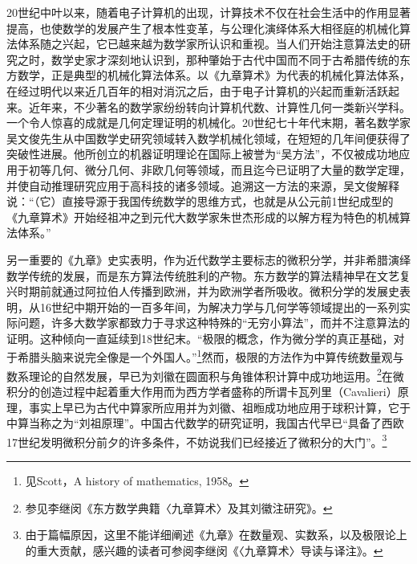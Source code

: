 \documentclass[12pt,UTF8]{ctexbook}
\begin{document}
20世纪中叶以来，随着电子计算机的出现，计算技术不仅在社会生活中的作用显著提高，也使数学的发展产生了根本性变革，与公理化演绎体系大相径庭的机械化算法体系随之兴起，它已越来越为数学家所认识和重视。当人们开始注意算法史的研究之时，数学史家才深刻地认识到，那种肇始于古代中国而不同于古希腊传统的东方数学，正是典型的机械化算法体系。以《九章算术》为代表的机械化算法体系，在经过明代以来近几百年的相对消沉之后，由于电子计算机的兴起而重新活跃起来。近年来，不少著名的数学家纷纷转向计算机代数、计算性几何一类新兴学科。一个令人惊喜的成就是几何定理证明的机械化。20世纪七十年代末期，著名数学家吴文俊先生从中国数学史研究领域转入数学机械化领域，在短短的几年间便获得了突破性进展。他所创立的机器证明理论在国际上被誉为“吴方法”，不仅被成功地应用于初等几何、微分几何、非欧几何等领域，而且迄今已证明了大量的数学定理，并使自动推理研究应用于高科技的诸多领域。追溯这一方法的来源，吴文俊解释说：“（它）直接导源于我国传统数学的思维方式，也就是从公元前1世纪成型的《九章算术》开始经祖冲之到元代大数学家朱世杰形成的以解方程为特色的机械算法体系。”

另一重要的《九章》史实表明，作为近代数学主要标志的微积分学，并非希腊演绎数学传统的发展，而是东方算法传统胜利的产物。东方数学的算法精神早在文艺复兴时期前就通过阿拉伯人传播到欧洲，并为欧洲学者所吸收。微积分学的发展史表明，从16世纪中期开始的一百多年间，为解决力学与几何学等领域提出的一系列实际问题，许多大数学家都致力于寻求这种特殊的“无穷小算法”，而并不注意算法的证明。这种倾向一直延续到18世纪末。“极限的概念，作为微分学的真正基础，对于希腊头脑来说完全像是一个外国人。”\footnote{见Scott，A history of mathematics, 1958。}然而，极限的方法作为中算传统数量观与数系理论的自然发展，早已为刘徽在圆面积与角锥体积计算中成功地运用。\footnote{参见李继闵《东方数学典籍〈九章算术〉及其刘徽注研究》。}在微积分的创造过程中起着重大作用而为西方学者盛称的所谓卡瓦列里（Cavalieri）原理，事实上早已为古代中算家所应用并为刘徽、祖暅成功地应用于球积计算，它于中算当称之为“刘祖原理”。中国古代数学的研究证明，我国古代早已“具备了西欧17世纪发明微积分前夕的许多条件，不妨说我们已经接近了微积分的大门”。\footnote{由于篇幅原因，这里不能详细阐述《九章》在数量观、实数系，以及极限论上的重大贡献，感兴趣的读者可参阅李继闵《〈九章算术〉导读与译注》。}
\end{document}
